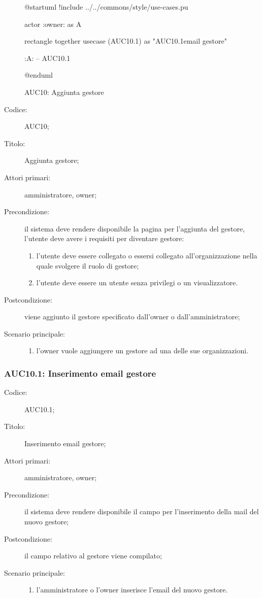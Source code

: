 \documentclass[../../../analisi-dei-requisiti.tex]{subfiles}
\begin{document}
\begin{figure}[H]
  \centering
  \begin{plantuml}
  @startuml
  !include ../../commons/style/use-cases.pu

  actor :owner: as A

  rectangle {
    together {
      usecase (AUC10.1) as "AUC10.1\nInserimento email gestore"
    }
  }

  :A: -- AUC10.1

  @enduml
  \end{plantuml}
  \caption{AUC10: Aggiunta gestore}%
  \label{fig:auc10}
\end{figure}

\begin{description}
  \item[Codice:] AUC10;
  \item[Titolo:] Aggiunta gestore;
  \item[Attori primari:] amministratore, owner;
  \item[Precondizione:] il sistema deve rendere disponibile la pagina per l'aggiunta del gestore, l'utente deve avere i requisiti per diventare gestore:
  \begin{enumerate}
    \item l'utente deve essere collegato o essersi collegato all'organizzazione nella quale svolgere il ruolo di gestore;
    \item l'utente deve essere un utente senza privilegi o un visualizzatore.
  \end{enumerate}
  \item[Postcondizione:] viene aggiunto il gestore specificato dall'owner o dall'amministratore;
  \item[Scenario principale:]
  \begin{enumerate}
    \item l'owner vuole aggiungere un gestore ad una delle sue organizzazioni.
  \end{enumerate}
\end{description}

\subsubsection{AUC10.1: Inserimento email gestore}%
\label{subs:auc10.1}
\begin{description}
  \item[Codice:] AUC10.1;
  \item[Titolo:] Inserimento email gestore;
  \item[Attori primari:] amministratore, owner;
  \item[Precondizione:] il sistema deve rendere disponibile il campo per l'inserimento della mail del nuovo gestore;
  \item[Postcondizione:] il campo relativo al gestore viene compilato;
  \item[Scenario principale:]
  \begin{enumerate}
    \item l'amministratore o l'owner inserisce l'email del nuovo gestore.
  \end{enumerate}
\end{description}
\end{document}
